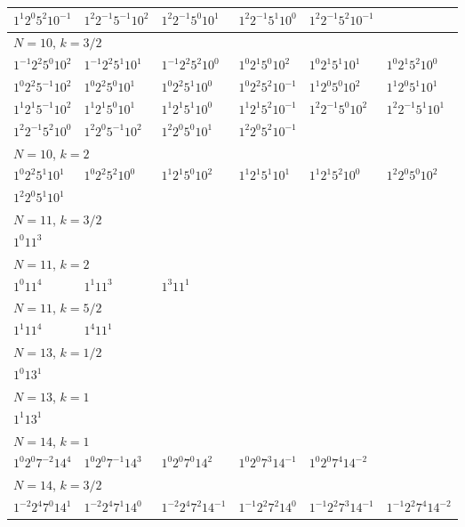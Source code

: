 \documentclass[12pt]{amsart}
\numberwithin{equation}{section}
\theoremstyle{plain}
\theoremstyle{definition}
\theoremstyle{remark}
\begin{document}
\begin{longtable}{llllll}
$1^{1}2^{0}5^{2}10^{-1}$ & $1^{2}2^{-1}5^{-1}10^{2}$ & $1^{2}2^{-1}5^{0}10^{1}$ & $1^{2}2^{-1}5^{1}10^{0}$ & $1^{2}2^{-1}5^{2}10^{-1}$ & \\
\midrule
\multicolumn{6}{l}{$N=10$, $k=3/2$}\\
$1^{-1}2^{2}5^{0}10^{2}$ & $1^{-1}2^{2}5^{1}10^{1}$ & $1^{-1}2^{2}5^{2}10^{0}$ & $1^{0}2^{1}5^{0}10^{2}$ & $1^{0}2^{1}5^{1}10^{1}$ & $1^{0}2^{1}5^{2}10^{0}$\\
$1^{0}2^{2}5^{-1}10^{2}$ & $1^{0}2^{2}5^{0}10^{1}$ & $1^{0}2^{2}5^{1}10^{0}$ & $1^{0}2^{2}5^{2}10^{-1}$ & $1^{1}2^{0}5^{0}10^{2}$ & $1^{1}2^{0}5^{1}10^{1}$\\
$1^{1}2^{1}5^{-1}10^{2}$ & $1^{1}2^{1}5^{0}10^{1}$ & $1^{1}2^{1}5^{1}10^{0}$ & $1^{1}2^{1}5^{2}10^{-1}$ & $1^{2}2^{-1}5^{0}10^{2}$ & $1^{2}2^{-1}5^{1}10^{1}$\\
$1^{2}2^{-1}5^{2}10^{0}$ & $1^{2}2^{0}5^{-1}10^{2}$ & $1^{2}2^{0}5^{0}10^{1}$ & $1^{2}2^{0}5^{2}10^{-1}$ & &\\
\midrule
\multicolumn{6}{l}{$N=10$, $k=2$}\\
$1^{0}2^{2}5^{1}10^{1}$ & $1^{0}2^{2}5^{2}10^{0}$ & $1^{1}2^{1}5^{0}10^{2}$ & $1^{1}2^{1}5^{1}10^{1}$ & $1^{1}2^{1}5^{2}10^{0}$ & $1^{2}2^{0}5^{0}10^{2}$\\
$1^{2}2^{0}5^{1}10^{1}$ & &&&&\\
\midrule
\multicolumn{6}{l}{$N=11$, $k=3/2$}\\
$1^{0}11^{3}$ & &&&&\\
\midrule
\multicolumn{6}{l}{$N=11$, $k=2$}\\
$1^{0}11^{4}$ & $1^{1}11^{3}$ & $1^{3}11^{1}$ & &&\\
\midrule
\multicolumn{6}{l}{$N=11$, $k=5/2$}\\
$1^{1}11^{4}$ & $1^{4}11^{1}$ & &&&\\
\midrule
\multicolumn{6}{l}{$N=13$, $k=1/2$}\\
$1^{0}13^{1}$ & &&&&\\
\midrule
\multicolumn{6}{l}{$N=13$, $k=1$}\\
$1^{1}13^{1}$ & &&&&\\
\midrule
\multicolumn{6}{l}{$N=14$, $k=1$}\\
$1^{0}2^{0}7^{-2}14^{4}$ & $1^{0}2^{0}7^{-1}14^{3}$ & $1^{0}2^{0}7^{0}14^{2}$ & $1^{0}2^{0}7^{3}14^{-1}$ & $1^{0}2^{0}7^{4}14^{-2}$ & \\
\midrule
\multicolumn{6}{l}{$N=14$, $k=3/2$}\\
$1^{-2}2^{4}7^{0}14^{1}$ & $1^{-2}2^{4}7^{1}14^{0}$ & $1^{-2}2^{4}7^{2}14^{-1}$ & $1^{-1}2^{2}7^{2}14^{0}$ & $1^{-1}2^{2}7^{3}14^{-1}$ & $1^{-1}2^{2}7^{4}14^{-2}$\\

\end{longtable}
\end{document}
